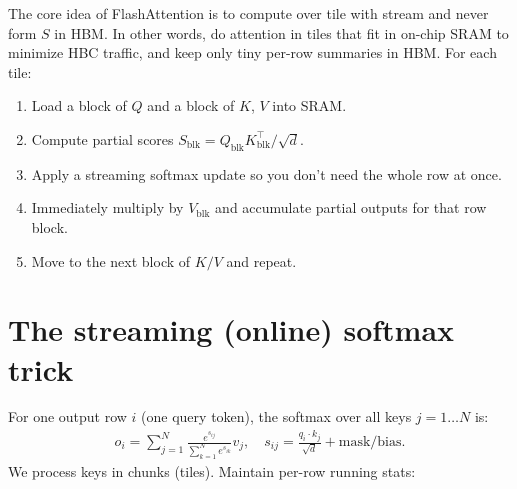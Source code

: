 The core idea of FlashAttention is to compute over tile with stream and never form $S$ in HBM. In other words, do attention in tiles that fit in on-chip SRAM to minimize HBC traffic, and keep only tiny per-row summaries in HBM. For each tile:

\begin{enumerate}
	\item Load a block of $Q$ and a block of $K$, $V$ into SRAM.
	\item Compute partial scores $S_{\text{blk}} = Q_{\text{blk}}K_{\text{blk}}^\top/\sqrt{d}$.
	\item Apply a streaming softmax update so you don't need the whole row at once.
	\item Immediately multiply by $V_{\text{blk}}$ and accumulate partial
		outputs for that row block.
	\item Move to the next block of $K/V$ and repeat.
\end{enumerate}

\section{The streaming (online) softmax trick}

For one output row $i$ (one query token), the softmax over all keys $j=1\ldots N$ is:
\begin{align*}
	o_i = \sum_{j=1}^N \frac{e^{s_{ij}}}{\sum_{k=1}^N e^{s_{ik}}} v_j,
	\quad s_{ij} = \frac{q_i\cdot k_j}{\sqrt{d}} + \text{mask/bias}.
\end{align*}
We process keys in chunks (\ie tiles). Maintain per-row running stats:

